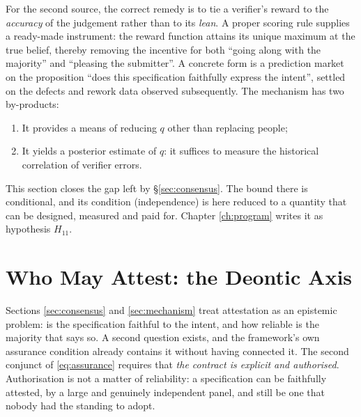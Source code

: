 \begin{principle}\label{pr:scoring}
For the second source, the correct remedy is to tie a verifier's reward to the
\emph{accuracy} of the judgement rather than to its \emph{lean}. A proper scoring rule
\cite{brier1950} supplies a ready-made instrument: the reward function attains its unique
maximum at the true belief, thereby removing the incentive for both ``going along with the
majority'' and ``pleasing the submitter''. A concrete form is a prediction market on the
proposition ``does this specification faithfully express the intent'', settled on the
defects and rework data observed subsequently. The mechanism has two by-products:
\begin{enumerate}[label=(\alph*)]
\item It provides a means of reducing $q$ other than replacing people;
\item It yields a posterior estimate of $q$: it suffices to measure the historical
      correlation of verifier errors.
\end{enumerate}
\end{principle}

This section closes the gap left by \S\ref{sec:consensus}. The bound there is conditional,
and its condition (independence) is here reduced to a quantity that can be designed,
measured and paid for. Chapter \ref{ch:program} writes it as hypothesis $H_{11}$.

\section{Who May Attest: the Deontic Axis}\label{sec:authority}

Sections \ref{sec:consensus} and \ref{sec:mechanism} treat attestation as an epistemic problem: is
the specification faithful to the intent, and how reliable is the majority that says so. A second
question exists, and the framework's own assurance condition already contains it without having
connected it. The second conjunct of \eqref{eq:assurance} requires that \emph{the contract is
explicit and authorised}. Authorisation is not a matter of reliability: a specification can be
faithfully attested, by a large and genuinely independent panel, and still be one that nobody had
the standing to adopt.

